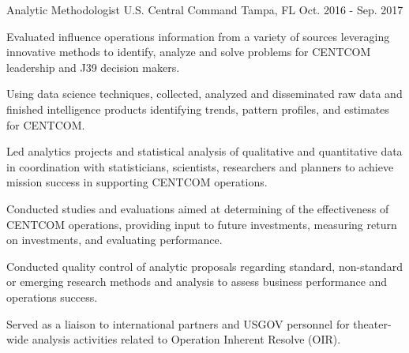 \begin{cventries}
  \cventry
    {Analytic Methodologist} %
    {U.S. Central Command} %
    {Tampa, FL} %
    {Oct. 2016 - Sep. 2017} %
    {
      \begin{cvitems} %
        \item {Evaluated influence operations information from a variety of sources leveraging innovative methods to identify, analyze and solve problems for CENTCOM leadership and J39 decision makers.}
        \item {Using data science techniques, collected, analyzed and disseminated raw data and finished intelligence products identifying trends, pattern profiles, and estimates for CENTCOM.}
        \item {Led analytics projects and statistical analysis of qualitative and quantitative data in coordination with statisticians, scientists, researchers and planners to achieve mission success in supporting CENTCOM operations.}
        \item {Conducted studies and evaluations aimed at determining of the effectiveness of CENTCOM operations, providing input to future investments, measuring return on investments, and evaluating performance.}
        \item {Conducted quality control of analytic proposals regarding standard, non-standard or emerging research methods and analysis to assess business performance and operations success.}
        \item {Served as a liaison to international partners and USGOV personnel for theater-wide analysis activities related to Operation Inherent Resolve (OIR).}
      \end{cvitems}
    }


\end{cventries}
